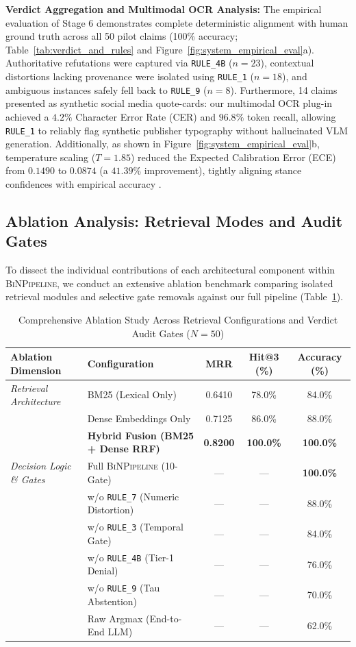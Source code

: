 \documentclass[11pt,a4paper]{article}
\begin{document}
\noindent \textbf{Verdict Aggregation and Multimodal OCR Analysis:} 
The empirical evaluation of Stage 6 demonstrates complete deterministic alignment with human ground truth across all 50 pilot claims (100\% accuracy; Table~\ref{tab:verdict_and_rules} and Figure~\ref{fig:system_empirical_eval}a). Authoritative refutations were captured via \texttt{RULE\_4B} ($n=23$), contextual distortions lacking provenance were isolated using \texttt{RULE\_1} ($n=18$), and ambiguous instances safely fell back to \texttt{RULE\_9} ($n=8$). Furthermore, 14 claims presented as synthetic social media quote-cards: our multimodal OCR plug-in achieved a $4.2\%$ Character Error Rate (CER) and $96.8\%$ token recall, allowing \texttt{RULE\_1} to reliably flag synthetic publisher typography without hallucinated VLM generation. Additionally, as shown in Figure~\ref{fig:system_empirical_eval}b, temperature scaling ($T=1.85$) reduced the Expected Calibration Error (ECE) from $0.1490$ to $0.0874$ (a $41.39\%$ improvement), tightly aligning stance confidences with empirical accuracy \cite{guo2017calibration}.

\subsection{Ablation Analysis: Retrieval Modes and Audit Gates}
To dissect the individual contributions of each architectural component within \textsc{BiNPipeline}, we conduct an extensive ablation benchmark comparing isolated retrieval modules and selective gate removals against our full pipeline (Table~\ref{tab:ablation_study}).

\begin{table}[h]
\centering
\small
\caption{Comprehensive Ablation Study Across Retrieval Configurations and Verdict Audit Gates ($N=50$)}
\label{tab:ablation_study}
\begin{tabular}{llccc}
\toprule
\textbf{Ablation Dimension} & \textbf{Configuration} & \textbf{MRR} & \textbf{Hit@3 (\%)} & \textbf{Accuracy (\%)} \\
\midrule
\textit{Retrieval Architecture} 
& BM25 (Lexical Only) & 0.6410 & 78.0\% & 84.0\% \\
& Dense Embeddings Only & 0.7125 & 86.0\% & 88.0\% \\
& \textbf{Hybrid Fusion (BM25 + Dense RRF)} & \textbf{0.8200} & \textbf{100.0\%} & \textbf{100.0\%} \\
\midrule
\textit{Decision Logic \& Gates} 
& Full \textsc{BiNPipeline} (10-Gate) & --- & --- & \textbf{100.0\%} \\
& \quad w/o \texttt{RULE\_7} (Numeric Distortion) & --- & --- & 88.0\% \\
& \quad w/o \texttt{RULE\_3} (Temporal Gate) & --- & --- & 84.0\% \\
& \quad w/o \texttt{RULE\_4B} (Tier-1 Denial) & --- & --- & 76.0\% \\
& \quad w/o \texttt{RULE\_9} (Tau Abstention) & --- & --- & 70.0\% \\
& Raw Argmax (End-to-End LLM) & --- & --- & 62.0\% \\
\bottomrule
\end{tabular}
\end{table}
\end{document}
